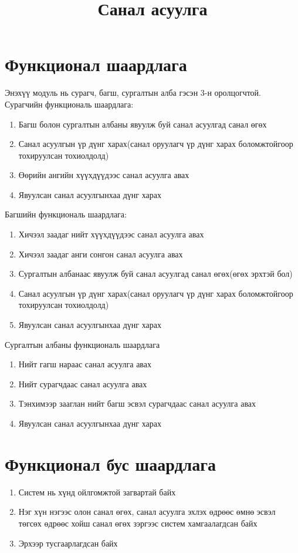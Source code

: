 \documentclass[12pt]{article}
\title{Санал асуулга}
\begin{document}
\section{Функционал шаардлага}
 Энэхүү модуль нь сурагч, багш, сургалтын алба гэсэн 3-н оролцогчтой.
Сурагчийн функциональ шаардлага:
\begin{enumerate}
	\item Багш болон сургалтын албаны явуулж буй санал асуулгад санал өгөх
	\item Санал асуулгын үр дүнг харах(санал оруулагч үр дүнг харах боломжтойгоор тохируулсан тохиолдолд)
	\item Өөрийн ангийн хүүхдүүдээс санал асуулга авах
	\item Явуулсан санал асуулгынхаа дүнг харах
\end{enumerate}
Багшийн функциональ шаардлага:
\begin{enumerate}
	\item Хичээл заадаг нийт хүүхдүүдээс санал асуулга авах
	\item Хичээл заадаг анги сонгон санал асуулга авах
	\item Сургалтын албанаас явуулж буй санал асуулгад санал өгөх(өгөх эрхтэй бол)
	\item Санал асуулгын үр дүнг харах(санал оруулагч үр дүнг харах боломжтойгоор тохируулсан тохиолдолд)
	\item Явуулсан санал асуулгынхаа дүнг харах 
\end{enumerate}
Сургалтын албаны функциональ шаардлага
\begin{enumerate}
	\item Нийт гагш нараас санал асуулга авах
	\item Нийт сурагчдаас санал асуулга авах
	\item Тэнхимээр зааглан нийт багш эсвэл сурагчдаас санал асуулга авах
	\item Явуулсан санал асуулгынхаа дүнг харах
	\end{enumerate}
\section{Функционал бус шаардлага}
\begin{enumerate}
	\item Систем нь хүнд ойлгомжтой загвартай байх
	\item Нэг хүн нэгээс олон санал өгөх, санал асуулга эхлэх өдрөөс өмнө эсвэл төгсөх өдрөөс хойш санал өгөх зэргээс систем хамгаалагдсан байх
	\item Эрхээр тусгаарлагдсан байх
\end{enumerate}
\end{document}
